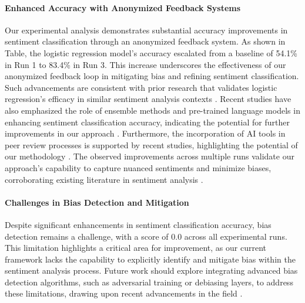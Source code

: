 \documentclass{article} %
\begin{document}
\paragraph{Enhanced Accuracy with Anonymized Feedback Systems} Our experimental analysis demonstrates substantial accuracy improvements in sentiment classification through an anonymized feedback system. As shown in Table, the logistic regression model's accuracy escalated from a baseline of 54.1\% in Run 1 to 83.4\% in Run 3. This increase underscores the effectiveness of our anonymized feedback loop in mitigating bias and refining sentiment classification. Such advancements are consistent with prior research that validates logistic regression's efficacy in similar sentiment analysis contexts \citep{sentiment2024,comparison2024,assessing2024,topic2024,innovative2024,comparative2023,sentiment2023,film2023,the2024,enhancing2024}. Recent studies have also emphasized the role of ensemble methods and pre-trained language models in enhancing sentiment classification accuracy, indicating the potential for further improvements in our approach \citep{an2023,pretrained2023}. Furthermore, the incorporation of AI tools in peer review processes is supported by recent studies, highlighting the potential of our methodology \citep{generative2025,using2024,enhancing2024}. The observed improvements across multiple runs validate our approach's capability to capture nuanced sentiments and minimize biases, corroborating existing literature in sentiment analysis \citep{confronting2022,automated2021,neural2025,emoshown2024,transformerbased2023,transsentlog2023,a2022,anomaly2021,sentiment2017,tick2024,quality2023,an2024,role2022,application2015,fasttext2022}.

\paragraph{Challenges in Bias Detection and Mitigation} Despite significant enhancements in sentiment classification accuracy, bias detection remains a challenge, with a score of 0.0 across all experimental runs. This limitation highlights a critical area for improvement, as our current framework lacks the capability to explicitly identify and mitigate bias within the sentiment analysis process. Future work should explore integrating advanced bias detection algorithms, such as adversarial training or debiasing layers, to address these limitations, drawing upon recent advancements in the field \citep{backdoor2023,latent2020,selfreported2023,studying1999,procare2012,electrochemical2001,adaptive2022,the2023,death2024,peer2020,reviewriter2025,peer2022,recognition2018,challenges2022,recognizability2022,the2024,a2025,decolonizing2025,level2025,emo2vec2018,advisory2024}.
\end{document}
